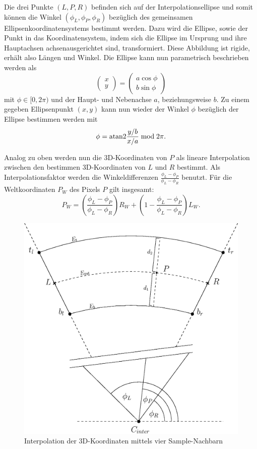 Die drei Punkte $(L, P, R)$ befinden sich auf der Interpolationsellipse und somit können die  Winkel $(\phi_L, \phi_P, \phi_R)$ bezüglich des gemeinsamen Ellipsenkoordinatensystems bestimmt werden. Dazu wird die Ellipse, sowie der Punkt in das Koordinatensystem, indem sich die Ellipse im Ursprung und ihre Hauptachsen achsenausgerichtet sind, transformiert. Diese Abbildung ist rigide, erhält also Längen und Winkel. Die Ellipse kann nun parametrisch beschrieben werden als
\[
\begin{pmatrix}x \\ y\end{pmatrix} = \begin{pmatrix}a\cos\phi \\
b\sin\phi\end{pmatrix}
\] %
mit $\phi \in [0, 2\pi)$ und der Haupt- und Nebenachse $a$, beziehungsweise $b$. Zu einem gegeben Ellipsenpunkt $(x,y)$ kann nun wieder der Winkel $\phi$ bezüglich der Ellipse bestimmen werden mit
\[
\phi = \text{atan2} \frac{y/b}{x/a} \bmod 2\pi.
\] %

Analog zu oben werden nun die 3D-Koordinaten von $P$ als lineare Interpolation zwischen den bestimmen 3D-Koordinaten von $L$ und $R$ bestimmt. Als Interpolationsfaktor werden die Winkeldifferenzen
$\frac{\phi_L - \phi_P}{\phi_L - \phi_R}$ benutzt. Für die Weltkoordinaten $P_W$ des Pixels $P$ gilt insgesamt: 
\[
P_W = \left(\frac{\phi_L - \phi_P}{\phi_L - \phi_R}\right) R_W + \left(1 - \frac{\phi_L - \phi_P}{\phi_L - \phi_R}\right) L_W.
\]

\begin{figure}[!htb]
	\centering
	\includegraphics[scale=.6]{images/radialInterpolation.eps}
	\caption{Interpolation der 3D-Koordinaten mittels vier Sample-Nachbarn}
	\label{fig:radialInterpolation}
\end{figure}

